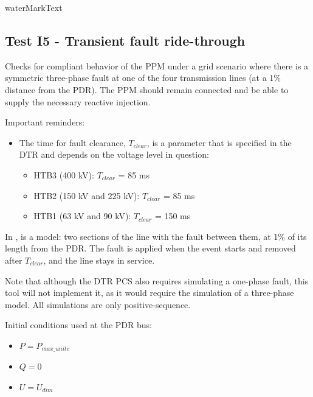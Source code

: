     {{ waterMarkText }}

    \renewcommand{\DTRPcs}{ThreePhaseFault} %
    \renewcommand{\PCSname}{PCS_RTE-I16z3}
    \renewcommand{\OCname}{TransientBolted}


    \subsection{Test I5 - Transient fault ride-through}

    Checks for compliant behavior of the PPM under a grid scenario where there
    is a symmetric three-phase fault at one of the four transmission lines
    (at a 1\% distance from the PDR). The PPM should remain connected and
    be able to supply the necessary reactive injection.

    \GridCircuitZthree

    \noindent Important reminders:
    \begin{itemize}
        \item The time for fault clearance, $T_{clear}$, is a parameter that
        is specified in the DTR and depends on the voltage level in
        question:
        \begin{itemize}
            \item HTB3 (400 kV): $T_{clear}$ = 85 ms
            \item HTB2 (150 kV and 225 kV): $T_{clear}$ = 85 ms
            \item HTB1 (63 kV and 90 kV): $T_{clear}$ = 150 ms
        \end{itemize}
    \end{itemize}

    In \Dynawo{},  is a  model: two sections of the
    line with the fault between them, at 1\% of its length from the PDR. The
    fault is applied when the event starts and removed after $T_{clear}$, and the
    line stays in service.

    Note that although the DTR PCS also requires simulating a one-phase
    fault, this tool will not implement it, as it would require the
    simulation of a three-phase model. All simulations are only
    positive-sequence.

    \begin{description}
        \item Initial conditions used at the PDR bus:
        \begin{itemize}
            \item $P = P_{max\_unite}$
            \item $Q = 0$
            \item $U = U_{dim}$
        \end{itemize}
    \end{description}

